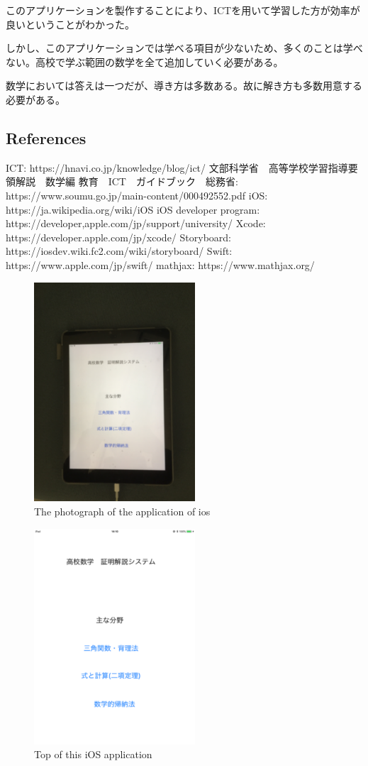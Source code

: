 \documentclass[ams]{U-AizuGT}
\begin{document}
このアプリケーションを製作することにより、ICTを用いて学習した方が効率が良いということがわかった。

しかし、このアプリケーションでは学べる項目が少ないため、多くのことは学べない。高校で学ぶ範囲の数学を全て追加していく必要がある。

数学においては答えは一つだが、導き方は多数ある。故に解き方も多数用意する必要がある。



\subsection{References}

     ICT: https://hnavi.co.jp/knowledge/blog/ict/
     文部科学省　高等学校学習指導要領解説　数学編
     教育　ICT　ガイドブック　総務省: https://www.soumu.go.jp/main-content/000492552.pdf
     iOS: https://ja.wikipedia.org/wiki/iOS
     iOS developer program: https://developer,apple.com/jp/support/university/
     Xcode: https://developer.apple.com/jp/xcode/
     Storyboard: https://iosdev.wiki.fc2.com/wiki/storyboard/
     Swift:  https://www.apple.com/jp/swift/
     mathjax: https://www.mathjax.org/
     \begin{figure}[htb]
       \centering
       \includegraphics[width=6cm]{img/figure3.pdf}
       \caption{The photograph of the application of ios}
       \label{fig:ict}
     \end{figure}

     \begin{figure}[htb]
       \centering
       \includegraphics[width=6cm]{img/figure4.pdf}
       \caption{Top of this iOS application}
       \label{fig:ict}
     \end{figure}
\end{document}
